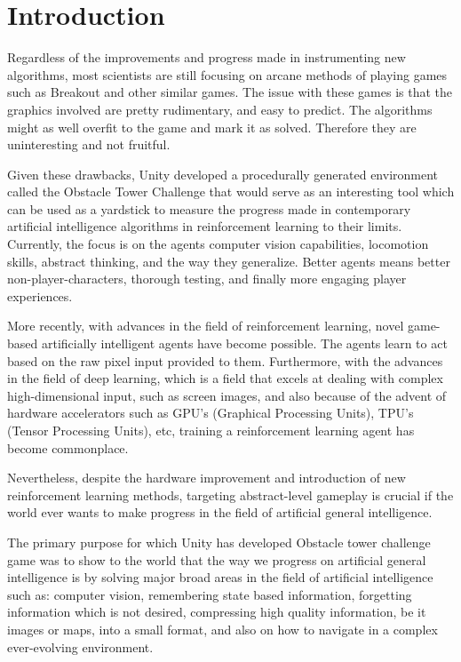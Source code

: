 \documentclass[conference]{IEEEtran}
\begin{document}
\section{Introduction}
Regardless of the improvements and progress made in instrumenting new algorithms, most scientists are still focusing on arcane methods of playing games such as Breakout and other similar games. The issue with these games is that the graphics involved are pretty rudimentary, and easy to predict. The algorithms might as well overfit to the game and mark it as solved. Therefore they are uninteresting and not fruitful.

Given these drawbacks, Unity developed a procedurally generated environment called the Obstacle Tower Challenge that would serve as an interesting tool which can be used as a yardstick to measure the progress made in contemporary artificial intelligence algorithms in reinforcement learning to their limits. Currently, the focus is on the agents computer vision capabilities, locomotion skills, abstract thinking, and the way they generalize. 
Better agents means better non-player-characters, thorough testing, and finally more engaging player experiences.

More recently, with advances in the field of reinforcement learning, novel game-based artificially intelligent agents have become possible. The agents learn to act based on the raw pixel input provided to them. Furthermore, with the advances in the field of deep learning, which is a field that excels at dealing with complex high-dimensional input, such as screen images, and also because of the advent of hardware accelerators such as GPU's (Graphical Processing Units), TPU's (Tensor Processing Units), etc, training a reinforcement learning agent has become commonplace.

Nevertheless, despite the hardware improvement and introduction of new reinforcement learning methods, targeting abstract-level gameplay is crucial if the world ever wants to make progress in the field of artificial general intelligence.

The primary purpose for which Unity has developed Obstacle tower challenge game was to show to the world that the way we progress on artificial general intelligence is by solving major broad areas in the field of artificial intelligence such as: computer vision, remembering state based information, forgetting information which is not desired, compressing high quality information, be it images or maps, into a small format, and also on how to navigate in a complex ever-evolving environment.
\end{document}
